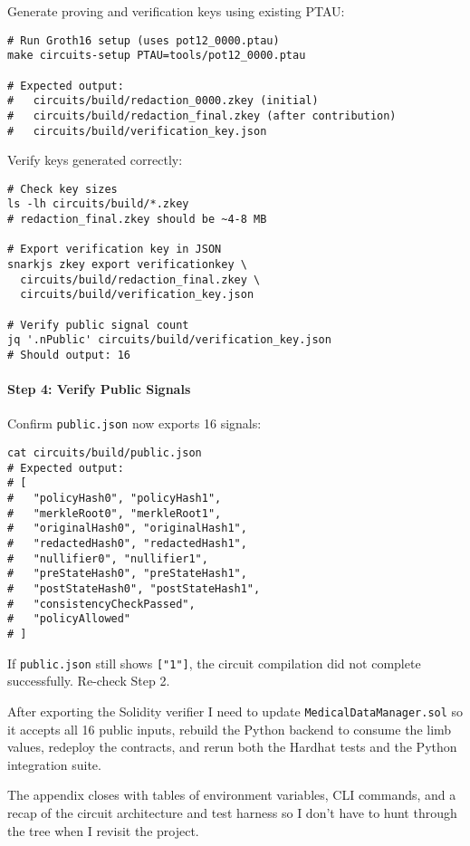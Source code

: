 Generate proving and verification keys using existing PTAU:

\begin{verbatim}
# Run Groth16 setup (uses pot12_0000.ptau)
make circuits-setup PTAU=tools/pot12_0000.ptau

# Expected output:
#   circuits/build/redaction_0000.zkey (initial)
#   circuits/build/redaction_final.zkey (after contribution)
#   circuits/build/verification_key.json
\end{verbatim}

Verify keys generated correctly:

\begin{verbatim}
# Check key sizes
ls -lh circuits/build/*.zkey
# redaction_final.zkey should be ~4-8 MB

# Export verification key in JSON
snarkjs zkey export verificationkey \
  circuits/build/redaction_final.zkey \
  circuits/build/verification_key.json

# Verify public signal count
jq '.nPublic' circuits/build/verification_key.json
# Should output: 16
\end{verbatim}

\paragraph{Step 4: Verify Public Signals}

Confirm \texttt{public.json} now exports 16 signals:

\begin{verbatim}
cat circuits/build/public.json
# Expected output:
# [
#   "policyHash0", "policyHash1",
#   "merkleRoot0", "merkleRoot1",
#   "originalHash0", "originalHash1",
#   "redactedHash0", "redactedHash1",
#   "nullifier0", "nullifier1",
#   "preStateHash0", "preStateHash1",
#   "postStateHash0", "postStateHash1",
#   "consistencyCheckPassed",
#   "policyAllowed"
# ]
\end{verbatim}

If \texttt{public.json} still shows \texttt{["1"]}, the circuit compilation did not complete successfully. Re-check Step 2.

After exporting the Solidity verifier I need to update \texttt{MedicalDataManager.sol} so it accepts all 16 public inputs, rebuild the Python backend to consume the limb values, redeploy the contracts, and rerun both the Hardhat tests and the Python integration suite.

The appendix closes with tables of environment variables, CLI commands, and a recap of the circuit architecture and test harness so I don’t have to hunt through the tree when I revisit the project.


